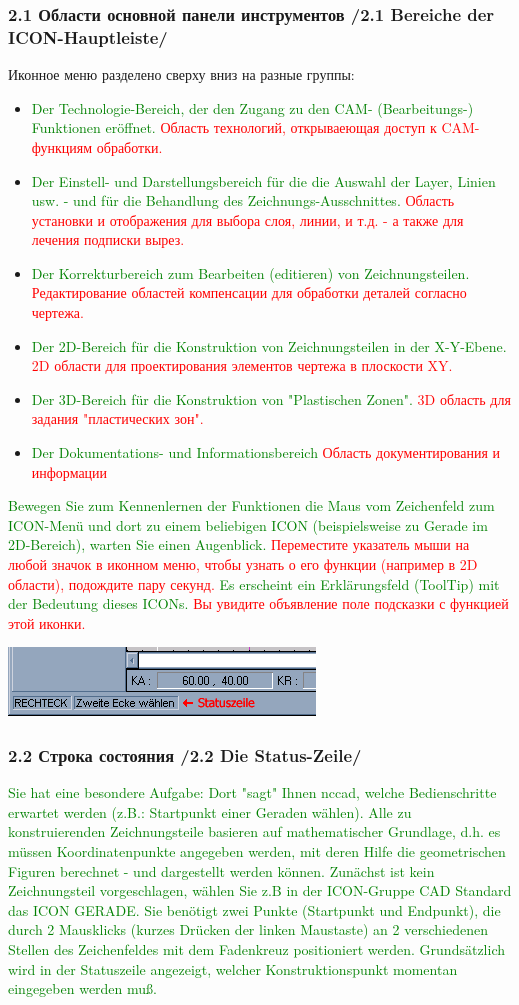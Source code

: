 \documentclass[14pt,a4paper]{book}
\newcommand{\DE}[1]{\textcolor{green}{#1}}
\newcommand{\RU}[1]{\textcolor{red}{#1}}
\newcommand{\TRsubsubsection}[2]{\subsubsection{#2 /#1/}}
\begin{document}
    \TRsubsubsection{2.1 Bereiche der ICON-Hauptleiste}{2.1 Области основной
    панели инструментов}
    
Иконное меню разделено сверху вниз на разные группы:

\begin{itemize}
  \item
\DE{Der Technologie-Bereich, der den Zugang zu den CAM- (Bearbeitungs-)
Funktionen eröffnet.}
\RU{Область технологий, открываеющая доступ к CAM-функциям обработки.}
  \item
\DE{Der Einstell- und Darstellungsbereich für die die Auswahl der Layer, Linien
usw. - und für die Behandlung des Zeichnungs-Ausschnittes.}
\RU{Область установки и отображения для выбора слоя, линии, и т.д. - а также для
лечения подписки вырез.}
  \item
\DE{Der Korrekturbereich zum Bearbeiten (editieren) von Zeichnungsteilen. }
\RU{Редактирование областей компенсации для обработки деталей согласно чертежа.}
  \item
\DE{Der 2D-Bereich für die Konstruktion von Zeichnungsteilen in der X-Y-Ebene. }
\RU{2D области для проектирования элементов чертежа в плоскости XY.}
  \item
\DE{Der 3D-Bereich für die Konstruktion von "Plastischen Zonen". }
\RU{3D область для задания "пластических зон".}
  \item
\DE{Der Dokumentations- und Informationsbereich }
\RU{Область документирования и информации}
\end{itemize}

\DE{Bewegen Sie zum Kennenlernen der Funktionen die Maus vom Zeichenfeld zum
ICON-Menü und dort zu einem beliebigen ICON (beispielsweise zu Gerade im 2D-Bereich), 
warten Sie einen Augenblick.}
\RU{Переместите указатель мыши на любой значок в иконном меню, чтобы узнать
о его функции (например в 2D области), подождите пару секунд.}
\DE{Es erscheint ein Erklärungsfeld (ToolTip) mit der
Bedeutung dieses ICONs.}
\RU{Вы увидите объявление поле подсказки с функцией этой иконки.}
    
\includegraphics{pic/Kons3.png}
    \TRsubsubsection{2.2 Die Status-Zeile}{2.2 Строка состояния}

\DE{Sie hat eine besondere Aufgabe:}
\DE{Dort "sagt" Ihnen nccad, welche Bedienschritte erwartet werden (z.B.:
Startpunkt einer Geraden wählen). }
\DE{Alle zu konstruierenden Zeichnungsteile basieren auf mathematischer
Grundlage, d.h.
es müssen Koordinatenpunkte angegeben werden, mit deren Hilfe die geometrischen 
Figuren berechnet - und dargestellt werden können.}
\DE{Zunächst ist kein Zeichnungsteil 
vorgeschlagen, wählen Sie z.B in der ICON-Gruppe CAD Standard das ICON GERADE.}
\DE{Sie benötigt zwei Punkte (Startpunkt und Endpunkt), die durch 2 Mausklicks (kurzes 
Drücken der linken Maustaste) an 2 verschiedenen Stellen des Zeichenfeldes mit dem
 Fadenkreuz positioniert werden.}
 \DE{Grundsätzlich wird in der Statuszeile angezeigt, 
 welcher Konstruktionspunkt momentan eingegeben werden muß.}
    
\end{document}
